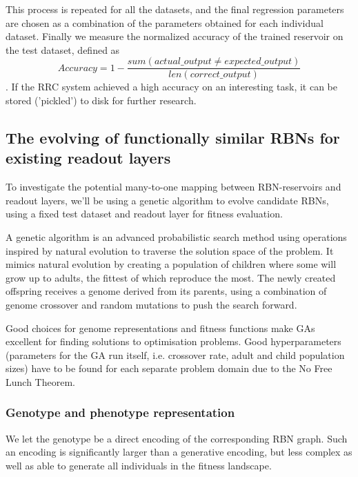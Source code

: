 This process is repeated for all the datasets,
and the final regression parameters are chosen as a combination of the parameters obtained for each individual dataset.
Finally we measure the normalized accuracy of the trained reservoir on the test dataset,
defined as
\begin{equation}
Accuracy = 1 - \dfrac{sum(actual\_output \neq expected\_output)}{len(correct\_output)}
\label{formula:accuracy}
\end{equation}
.
If the RRC system achieved a high accuracy on an interesting task,
it can be stored ('pickled') to disk for further research.

\subsection{The evolving of functionally similar RBNs for existing readout layers}

To investigate the potential many-to-one mapping between RBN-reservoirs and readout layers,
we'll be using a genetic algorithm to evolve candidate RBNs,
using a fixed test dataset and readout layer for fitness evaluation.

A genetic algorithm is an advanced probabilistic search method using operations inspired by natural evolution to traverse the solution space of the problem.
It mimics natural evolution by creating a population of children where some will grow up to adults,
the fittest of which reproduce the most.
The newly created offspring receives a genome derived from its parents,
using a combination of genome crossover and random mutations to push the search forward.

Good choices for genome representations and fitness functions make GAs excellent for finding solutions to optimisation problems.
Good hyperparameters (parameters for the GA run itself, i.e. crossover rate, adult and child population sizes)
have to be found for each separate problem domain due to the No Free Lunch Theorem.

\subsubsection{Genotype and phenotype representation}

We let the genotype be a direct encoding of the corresponding RBN graph.
Such an encoding is significantly larger than a generative encoding,
but less complex as well as able to generate all individuals in the fitness landscape.


